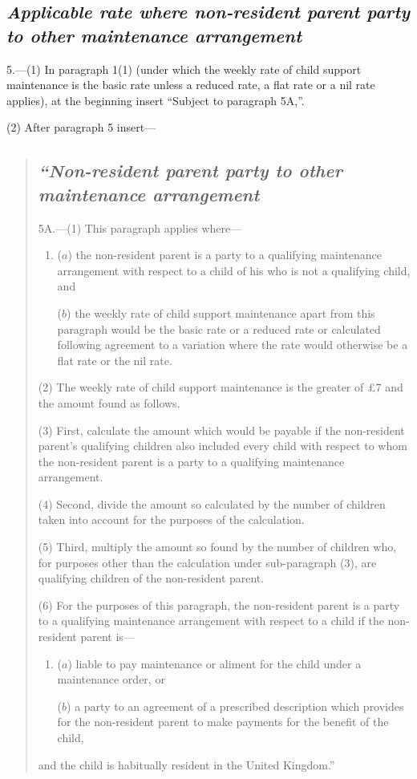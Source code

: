 \documentclass[12pt,a4paper]{article}
\begin{document}
\subsection*{\itshape\sloppy Applicable rate where non-resident parent party to other maintenance arrangement}

5.---(1) In paragraph 1(1) (under which the weekly rate of child support maintenance is the basic rate unless a reduced rate, a flat rate or a nil rate applies), at the beginning insert “Subject to paragraph 5A,”.

(2) After paragraph 5 insert—
\begin{quotation}
\subsection*{\itshape “Non-resident parent party to other maintenance arrangement}

5A.---(1) This paragraph applies where—
\begin{enumerate}\item[]
($a$) the non-resident parent is a party to a qualifying maintenance arrangement with respect to a child of his who is not a qualifying child, and

($b$) the weekly rate of child support maintenance apart from this paragraph would be the basic rate or a reduced rate or calculated following agreement to a variation where the rate would otherwise be a flat rate or the nil rate.
\end{enumerate}

(2) The weekly rate of child support maintenance is the greater of £7 and the amount found as follows.

(3) First, calculate the amount which would be payable if the non-resident parent's qualifying children also included every child with respect to whom the non-resident parent is a party to a qualifying maintenance arrangement.

(4) Second, divide the amount so calculated by the number of children taken into account for the purposes of the calculation.

(5) Third, multiply the amount so found by the number of children who, for purposes other than the calculation under sub-\hspace{0pt}paragraph (3), are qualifying children of the non-resident parent.

(6) For the purposes of this paragraph, the non-resident parent is a party to a qualifying maintenance arrangement with respect to a child if the non-resident parent is—
\begin{enumerate}\item[]
($a$) liable to pay maintenance or aliment for the child under a maintenance order, or

($b$) a party to an agreement of a prescribed description which provides for the non-resident parent to make payments for the benefit of the child,
\end{enumerate}
and the child is habitually resident in the United Kingdom.”
\end{quotation}
\end{document}
